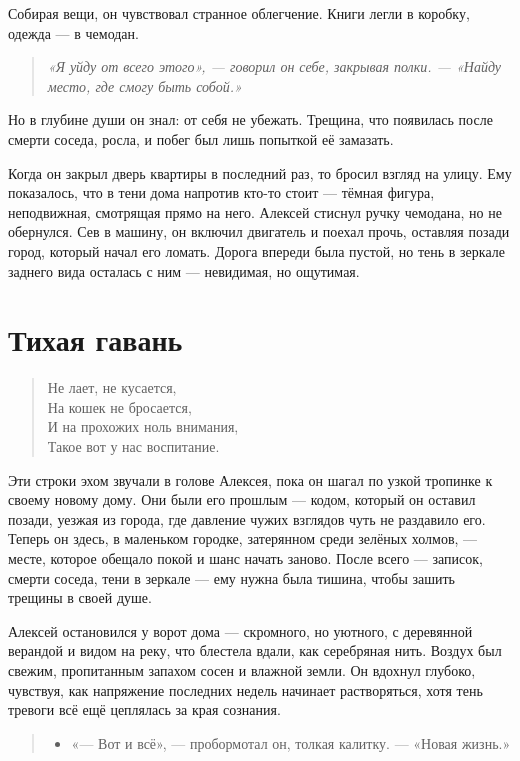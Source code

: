 \documentclass[12pt,a4paper]{book}
\newenvironment{dialogue}{\begin{quote}\itshape\begin{itemize}\item[]}{\end{itemize}\end{quote}}
\newenvironment{innerthought}{\begin{quote}\small\itshape}{\end{quote}}
\begin{document}
Собирая вещи, он чувствовал странное облегчение. Книги легли в коробку, одежда — в чемодан. 

\begin{innerthought}
«Я уйду от всего этого», — говорил он себе, закрывая полки. — «Найду место, где смогу быть собой.»
\end{innerthought}

Но в глубине души он знал: от себя не убежать. Трещина, что появилась после смерти соседа, росла, и побег был лишь попыткой её замазать.

Когда он закрыл дверь квартиры в последний раз, то бросил взгляд на улицу. Ему показалось, что в тени дома напротив кто-то стоит — тёмная фигура, неподвижная, смотрящая прямо на него. Алексей стиснул ручку чемодана, но не обернулся. Сев в машину, он включил двигатель и поехал прочь, оставляя позади город, который начал его ломать. Дорога впереди была пустой, но тень в зеркале заднего вида осталась с ним — невидимая, но ощутимая.

\chapter{Тихая гавань}

\begin{verse}
Не лает, не кусается,\\
На кошек не бросается,\\
И на прохожих ноль внимания,\\
Такое вот у нас воспитание.
\end{verse}

Эти строки эхом звучали в голове Алексея, пока он шагал по узкой тропинке к своему новому дому. Они были его прошлым — кодом, который он оставил позади, уезжая из города, где давление чужих взглядов чуть не раздавило его. Теперь он здесь, в маленьком городке, затерянном среди зелёных холмов, — месте, которое обещало покой и шанс начать заново. После всего — записок, смерти соседа, тени в зеркале — ему нужна была тишина, чтобы зашить трещины в своей душе.

Алексей остановился у ворот дома — скромного, но уютного, с деревянной верандой и видом на реку, что блестела вдали, как серебряная нить. Воздух был свежим, пропитанным запахом сосен и влажной земли. Он вдохнул глубоко, чувствуя, как напряжение последних недель начинает растворяться, хотя тень тревоги всё ещё цеплялась за края сознания.

\begin{dialogue}
«— Вот и всё», — пробормотал он, толкая калитку. — «Новая жизнь.»
\end{dialogue}
\end{document}
